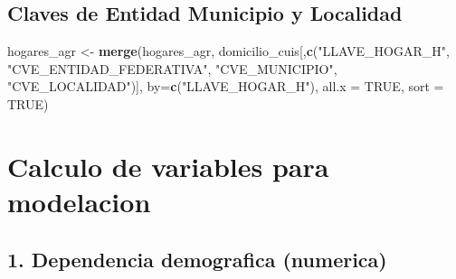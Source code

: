 \documentclass[11pt,]{article}
\newenvironment{Shaded}{\begin{snugshade}}{\end{snugshade}}
\newcommand{\KeywordTok}[1]{\textcolor[rgb]{0.13,0.29,0.53}{\textbf{#1}}}
\newcommand{\DataTypeTok}[1]{\textcolor[rgb]{0.13,0.29,0.53}{#1}}
\newcommand{\DecValTok}[1]{\textcolor[rgb]{0.00,0.00,0.81}{#1}}
\newcommand{\StringTok}[1]{\textcolor[rgb]{0.31,0.60,0.02}{#1}}
\newcommand{\CommentTok}[1]{\textcolor[rgb]{0.56,0.35,0.01}{\textit{#1}}}
\newcommand{\OtherTok}[1]{\textcolor[rgb]{0.56,0.35,0.01}{#1}}
\newcommand{\OperatorTok}[1]{\textcolor[rgb]{0.81,0.36,0.00}{\textbf{#1}}}
\newcommand{\NormalTok}[1]{#1}
\begin{document}
\subsection{Claves de Entidad Municipio y
Localidad}\label{claves-de-entidad-municipio-y-localidad}

\begin{Shaded}
\begin{Highlighting}[]
\NormalTok{hogares_agr <-}\StringTok{ }\KeywordTok{merge}\NormalTok{(hogares_agr,}
\NormalTok{                 domicilio_cuis[,}\KeywordTok{c}\NormalTok{(}\StringTok{"LLAVE_HOGAR_H"}\NormalTok{,}
                                   \StringTok{"CVE_ENTIDAD_FEDERATIVA"}\NormalTok{,}
                                   \StringTok{"CVE_MUNICIPIO"}\NormalTok{,}
                                   \StringTok{"CVE_LOCALIDAD"}\NormalTok{)],}
                 \DataTypeTok{by=}\KeywordTok{c}\NormalTok{(}\StringTok{"LLAVE_HOGAR_H"}\NormalTok{),}
                 \DataTypeTok{all.x =} \OtherTok{TRUE}\NormalTok{,}
                 \DataTypeTok{sort =} \OtherTok{TRUE}\NormalTok{)}
\end{Highlighting}
\end{Shaded}

\section{Calculo de variables para
modelacion}\label{calculo-de-variables-para-modelacion}

\subsection{1. Dependencia demografica
(numerica)}\label{dependencia-demografica-numerica}

\begin{Shaded}
\end{Shaded}
\end{document}
